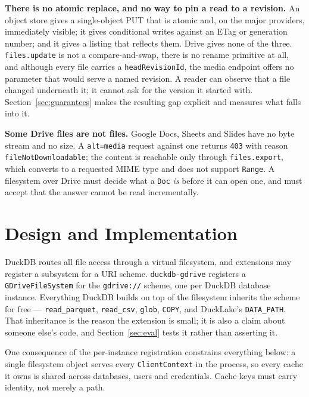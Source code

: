 \documentclass[sigconf, nonacm]{acmart}
\begin{document}
\textbf{There is no atomic replace, and no way to pin a read to a revision.}
An object store gives a single-object PUT that is atomic and, on the major
providers, immediately visible; it gives conditional writes against an ETag or
generation number; and it gives a listing that reflects them. Drive gives none
of the three. \texttt{files.update} is not a compare-and-swap, there is no
rename primitive at all, and although every file carries a
\texttt{headRevisionId}, the media endpoint offers no parameter that would
serve a named revision. A reader can observe that a file changed underneath
it; it cannot ask for the version it started with.
Section~\ref{sec:guarantees} makes the resulting gap explicit and measures
what falls into it.

\textbf{Some Drive files are not files.}
Google Docs, Sheets and Slides have no byte stream and no size. A
\texttt{alt=media} request against one returns \texttt{403} with reason
\texttt{fileNotDownloadable}; the content is reachable only through
\texttt{files.export}, which converts to a requested MIME type and does not
support \texttt{Range}. A filesystem over Drive must decide what a
\texttt{Doc} \emph{is} before it can open one, and must accept that the answer
cannot be read incrementally.

\section{Design and Implementation}
\label{sec:design}

DuckDB routes all file access through a virtual filesystem, and extensions may
register a subsystem for a URI scheme. \texttt{duckdb-gdrive} registers a
\texttt{GDriveFileSystem} for the \texttt{gdrive://} scheme, one per DuckDB
database instance. Everything DuckDB builds on top of the filesystem
inherits the scheme for free --- \texttt{read\_parquet}, \texttt{read\_csv},
\texttt{glob}, \texttt{COPY}, and DuckLake's
\texttt{DATA\_PATH}. That inheritance is the reason the extension is small; it
is also a claim about someone else's code, and Section~\ref{sec:eval} tests it
rather than asserting it.

One consequence of the per-instance registration constrains everything below:
a single filesystem object serves every \texttt{ClientContext} in the process,
so every cache it owns is shared across databases, users and credentials.
Cache keys must carry identity, not merely a path.
\end{document}
